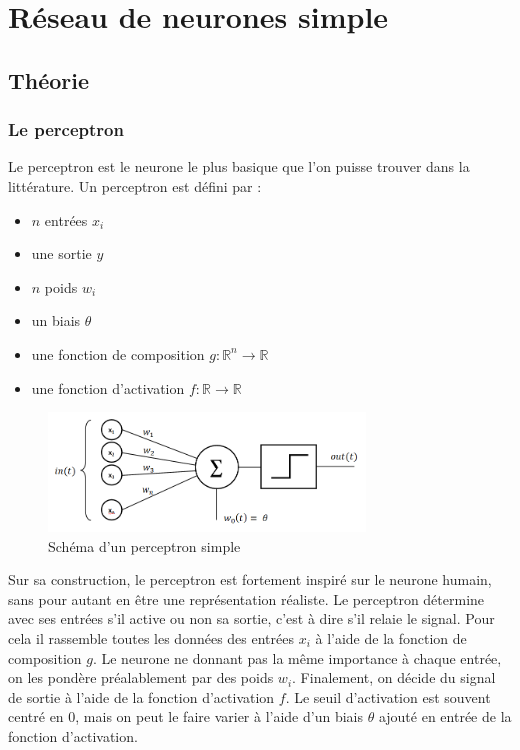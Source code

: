 
\chapter{Réseau de neurones simple}

\section{Théorie}

\subsection{Le perceptron}

Le perceptron est le neurone le plus basique que l'on puisse trouver dans la
littérature. Un perceptron est défini par :

\begin{itemize}
  \item $n$ entrées $x_i$
  \item une sortie $y$
  \item $n$ poids $w_i$
  \item un biais $\theta$
  \item une fonction de composition $g : \mathbb{R}^n \to \mathbb{R}$
  \item une fonction d'activation $f : \mathbb{R} \to \mathbb{R}$
\end{itemize}

\begin{figure}[!ht]
\begin{center}
\includegraphics[width=0.75\textwidth]{images/perceptron.png}
\end{center}
\caption{Schéma d'un perceptron simple}
\end{figure}

\vspace{\parskip}
Sur sa construction, le perceptron est fortement inspiré sur le neurone humain,
sans pour autant en être une représentation réaliste.
Le perceptron détermine avec ses entrées s'il active ou non sa sortie, c'est
à dire s'il relaie le signal. Pour cela il rassemble toutes les données des
entrées $x_i$ à l'aide de la fonction de composition $g$. Le neurone ne donnant
pas la même importance à chaque entrée, on les pondère préalablement par des
poids $w_i$.
Finalement, on décide du signal de sortie à l'aide de la fonction d'activation
$f$. Le seuil d'activation est souvent centré en $0$, mais on peut le faire varier à
l'aide d'un biais $\theta$ ajouté en entrée de la fonction d'activation.

